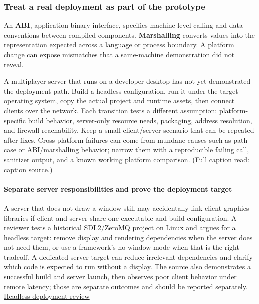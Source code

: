 \subsubsection{Treat a real deployment as part of the prototype}\label{06-engine-ii-ch040-treat-a-real-deployment-as-part-of-the-prototype}

\hypertarget{06-engine-ii-ch040-treat-a-real-deployment-as-part-of-the-prototype}{}

An \textbf{ABI}, application binary interface, specifies machine-level calling and data conventions between compiled components. \textbf{Marshalling} converts values into the representation expected across a language or process boundary. A platform change can expose mismatches that a same-machine demonstration did not reveal.

A multiplayer server that runs on a developer desktop has not yet demonstrated the deployment path. Build a headless configuration, run it under the target operating system, copy the actual project and runtime assets, then connect clients over the network. Each transition tests a different assumption: platform-specific build behavior, server-only resource needs, packaging, address resolution, and firewall reachability. Keep a small client/server scenario that can be repeated after fixes. Cross-platform failures can come from mundane causes such as path case or ABI/marshalling behavior; narrow them with a reproducible failing call, sanitizer output, and a known working platform comparison. (Full caption read: \href{https://www.youtube.com/watch?v=hDCnTTyxLl8}{caption source}.)

\paragraph{Separate server responsibilities and prove the deployment target}\label{06-engine-ii-ch040-separate-server-responsibilities-and-prove-the-deployment-target}

\hypertarget{06-engine-ii-ch040-separate-server-responsibilities-and-prove-the-deployment-target}{}

A server that does not draw a window still may accidentally link client graphics libraries if client and server share one executable and build configuration. A reviewer tests a historical SDL2/ZeroMQ project on Linux and argues for a headless target: remove display and rendering dependencies when the server does not need them, or use a framework's no-window mode when that is the right tradeoff. A dedicated server target can reduce irrelevant dependencies and clarify which code is expected to run without a display. The source also demonstrates a successful build and server launch, then observes poor client behavior under remote latency; those are separate outcomes and should be reported separately. \href{https://www.youtube.com/watch?v=lAXOmE481j4&t=5m33s}{Headless deployment review}

